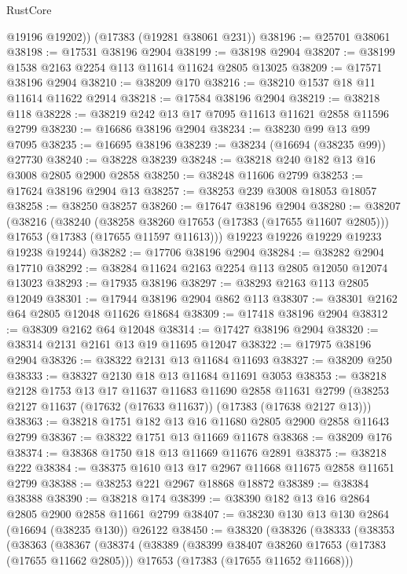 \begin{lexlean}{RustCore}
\begin{coremodule}
        @19196
        @19202))
    (@17383 (@19281 @38061 @231))
@38196 := @25701 @38061
@38198 := @17531 @38196 @2904
@38199 := @38198 @2904
@38207 := @38199 @1538 @2163 @2254 @113 @11614 @11624 @2805 @13025
@38209 := @17571 @38196 @2904
@38210 := @38209 @170
@38216 := @38210 @1537 @18 @11 @11614 @11622 @2914
@38218 := @17584 @38196 @2904
@38219 := @38218 @118
@38228 := @38219 @242 @13 @17 @7095 @11613 @11621 @2858 @11596 @2799
@38230 := @16686 @38196 @2904
@38234 := @38230 @99 @13 @99 @7095
@38235 := @16695 @38196
@38239 := @38234 (@16694 (@38235 @99)) @27730
@38240 := @38228 @38239
@38248 := @38218 @240 @182 @13 @16 @3008 @2805 @2900 @2858
@38250 := @38248 @11606 @2799
@38253 := @17624 @38196 @2904 @13
@38257 := @38253 @239 @3008 @18053 @18057
@38258 := @38250 @38257
@38260 := @17647 @38196 @2904
@38280 := @38207
    (@38216
      (@38240
        (@38258 @38260 @17653 (@17383 (@17655 @11607 @2805)))
        @17653
        (@17383 (@17655 @11597 @11613)))
      @19223
      @19226
      @19229
      @19233
      @19238
      @19244)
@38282 := @17706 @38196 @2904
@38284 := @38282 @2904 @17710
@38292 := @38284 @11624 @2163 @2254 @113 @2805 @12050 @12074 @13023
@38293 := @17935 @38196
@38297 := @38293 @2163 @113 @2805 @12049
@38301 := @17944 @38196 @2904 @862 @113
@38307 := @38301 @2162 @64 @2805 @12048 @11626 @18684
@38309 := @17418 @38196 @2904
@38312 := @38309 @2162 @64 @12048
@38314 := @17427 @38196 @2904
@38320 := @38314 @2131 @2161 @13 @19 @11695 @12047
@38322 := @17975 @38196 @2904
@38326 := @38322 @2131 @13 @11684 @11693
@38327 := @38209 @250
@38333 := @38327 @2130 @18 @13 @11684 @11691 @3053
@38353 := @38218
    @2128
    @1753
    @13
    @17
    @11637
    @11683
    @11690
    @2858
    @11631
    @2799
    (@38253 @2127 @11637 (@17632 (@17633 @11637)) (@17383 (@17638 @2127 @13)))
@38363 := @38218 @1751 @182 @13 @16 @11680 @2805 @2900 @2858 @11643 @2799
@38367 := @38322 @1751 @13 @11669 @11678
@38368 := @38209 @176
@38374 := @38368 @1750 @18 @13 @11669 @11676 @2891
@38375 := @38218 @222
@38384 := @38375 @1610 @13 @17 @2967 @11668 @11675 @2858 @11651 @2799
@38388 := @38253 @221 @2967 @18868 @18872
@38389 := @38384 @38388
@38390 := @38218 @174
@38399 := @38390 @182 @13 @16 @2864 @2805 @2900 @2858 @11661 @2799
@38407 := @38230 @130 @13 @130 @2864 (@16694 (@38235 @130)) @26122
@38450 := @38320
    (@38326
      (@38333
        (@38353
          (@38363
            (@38367
              (@38374
                (@38389
                  (@38399 @38407 @38260 @17653 (@17383 (@17655 @11662 @2805)))
                  @17653
                  (@17383 (@17655 @11652 @11668)))

\end{coremodule}
\end{lexlean}
